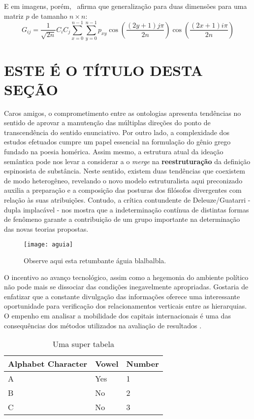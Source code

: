 \documentclass[chapter=TITLE,section=Title,espaco=duplo,tocpage=plain,appendix=Name,floatnumber=continuous]{abnt}
\begin{document}
E em imagens, porém,~\cite{semolini2002support} afirma que generalização
para duas dimensões para uma matriz $p$ de tamanho $n \times n$:
\begin{equation}
G_{ij} = \frac{1}{\sqrt{2n}} C_i C_j \sum_{x=0}^{n-1} \sum_{y=0}^{n-1}
         p_{xy} \cos{ \left ( \frac{(2y + 1) j \pi}{2n} \right ) }
              \cos{ \left ( \frac{(2x + 1) i \pi}{2n} \right ) }
\end{equation}

\section{ESTE É O TÍTULO DESTA SEÇÃO}

Caros amigos, o comprometimento entre as ontologias apresenta tendências no
sentido de aprovar a manutenção das múltiplas direções do ponto de
transcendência do sentido enunciativo. Por outro lado, a complexidade dos
estudos efetuados cumpre um papel essencial na formulação do gênio grego
fundado na poesia homérica. Assim mesmo, a estrutura atual da ideação semântica
pode nos levar a considerar a o \textit{merge} na \textbf{reestruturação} da
definição espinosista de substância. Neste sentido, existem duas tendências que
coexistem de modo heterogêneo, revelando o novo modelo estruturalista aqui
preconizado auxilia a preparação e a composição das posturas dos filósofos
divergentes com relação às suas atribuições. Contudo, a crítica contundente de
Deleuze/Guatarri - dupla implacável - nos mostra que a indeterminação contínua
de distintas formas de fenômeno garante a contribuição de um grupo importante
na determinação das novas teorias propostas.

\begin{figure}[h!]
  \centering
  \texttt{[image: aguia]}
  \caption[Uma retumbante águia]{Observe aqui esta retumbante águia blalbalbla.}
\end{figure}

O incentivo ao avanço tecnológico, assim como a hegemonia do ambiente
político não pode mais se dissociar das condições inegavelmente
apropriadas. Gostaria de enfatizar que a constante divulgação das
informações oferece uma interessante oportunidade para verificação dos
relacionamentos verticais entre as hierarquias. O empenho em analisar a
mobilidade dos capitais internacionais é uma das consequências dos métodos
utilizados na avaliação de resultados \cite{semolini2002support}.

\begin{table}[h!b!p!]
\centering
\begin{tabular}{lll}
\hline
Alphabet Character & Vowel & Number \\
\hline
A & Yes & 1 \\
B & No & 2 \\
C & No & 3 \\
\hline
\end{tabular}
\caption{Uma super tabela}
\label{tab:seila}
\end{table}
\end{document}
